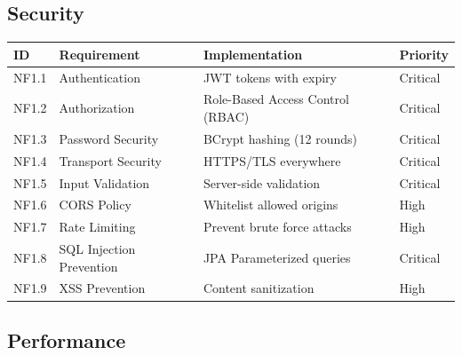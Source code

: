 \documentclass[
  12pt,
  a4paperpaper,
]{report}
\newcounter{none} %
\begin{document}
\subsection{Security}\label{security}

{\def\LTcaptype{none} %
\begin{longtable}[]{@{}
  >{\raggedright\arraybackslash}p{}
  >{\raggedright\arraybackslash}p{}
  >{\raggedright\arraybackslash}p{}
  >{\raggedright\arraybackslash}p{}@{}}
\hline
\begin{minipage}[b]{\linewidth}\raggedright
ID
\end{minipage} & \begin{minipage}[b]{\linewidth}\raggedright
Requirement
\end{minipage} & \begin{minipage}[b]{\linewidth}\raggedright
Implementation
\end{minipage} & \begin{minipage}[b]{\linewidth}\raggedright
Priority
\end{minipage} \\
\hline
\endhead
\hline
\endlastfoot
NF1.1 & Authentication & JWT tokens with expiry & Critical \\
NF1.2 & Authorization & Role-Based Access Control (RBAC) & Critical \\
NF1.3 & Password Security & BCrypt hashing (12 rounds) & Critical \\
NF1.4 & Transport Security & HTTPS/TLS everywhere & Critical \\
NF1.5 & Input Validation & Server-side validation & Critical \\
NF1.6 & CORS Policy & Whitelist allowed origins & High \\
NF1.7 & Rate Limiting & Prevent brute force attacks & High \\
NF1.8 & SQL Injection Prevention & JPA Parameterized queries &
Critical \\
NF1.9 & XSS Prevention & Content sanitization & High \\
\end{longtable}
}

\subsection{Performance}\label{performance}
\end{document}

